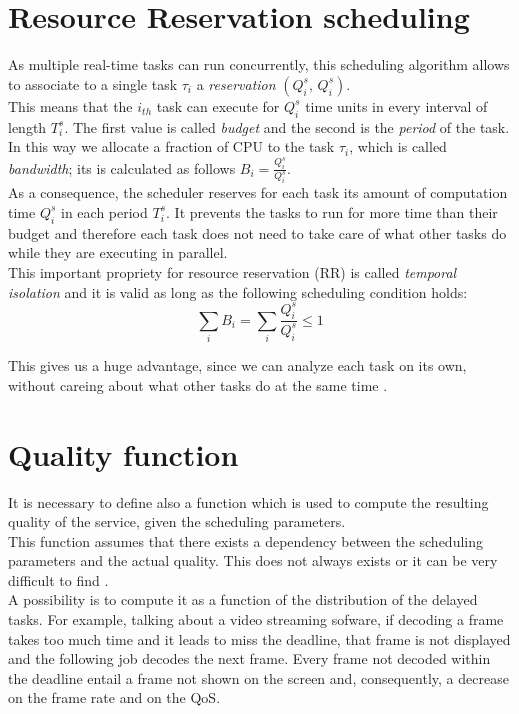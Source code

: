 \section{Resource Reservation scheduling}
As multiple real-time tasks can run concurrently, this scheduling algorithm allows to associate to a single task \( \tau_{i} \) a \emph{reservation} \( \left(Q_{i}^s,\,Q_{i}^s\right) \).\\ 
This means that the \( i_{th} \) task can execute for \( Q_{i}^s \) time units in every interval of length \( T_{i}^s \). The first value is called \emph{budget} and the second is the \emph{period} of the task.\\
In this way we allocate a fraction of CPU to the task \( \tau_{i} \), which is called \emph{bandwidth}; its is calculated as follows \( B_{i} = \frac{Q_{i}^s}{Q_{i}^s}\).\\
As a consequence, the scheduler reserves for each task its amount of computation time \( Q_{i}^s \) in each period \( T_{i}^s \). It prevents the tasks to run for more time than their budget and therefore each task does not need to take care of what other tasks do while they are executing in parallel.\\
This important propriety for resource reservation (RR) is called \emph{temporal isolation} and it is valid as long as the following scheduling condition holds:
\begin{equation} \tag{1} \label{schedCond}
  \displaystyle\sum_{i} B_{i} =  \displaystyle\sum_{i} \frac{Q_{i}^s}{Q_{i}^s} \leq 1
\end{equation}

This gives us a huge advantage, since we can analyze each task on its own, without careing about what other tasks do at the same time \cite{probGuarantees}.

\section{Quality function}
It is necessary to define also a function which is used to compute the resulting quality of the service, given the scheduling parameters.\\
This function assumes that there exists a dependency between the scheduling parameters and the actual quality. This does not always exists or it can be very difficult to find \cite{prosit}.\\
A possibility is to compute it as a function of the distribution of the delayed tasks. For example, talking about a video streaming sofware, if decoding a frame takes too much time and it leads to miss the deadline, that frame is not displayed and the following job decodes the next frame. Every frame not decoded within the deadline entail a frame not shown on the screen and, consequently, a decrease on the frame rate and on the QoS. 


